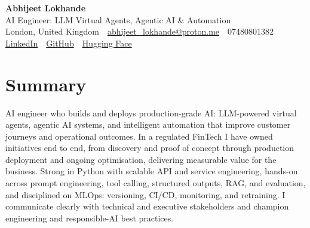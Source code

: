 \documentclass[10pt,a4paper]{article}
\newcommand{\sep}{\,\textcolor{accent!60}{\textbar}\,}
\begin{document}
\begin{center}
  {\fontsize{24}{26}\selectfont\bfseries Abhijeet Lokhande}\\[3pt]
  {\color{accent}\large AI Engineer: LLM Virtual Agents, Agentic AI \& Automation}\\[5pt]
  {\small
    London, United Kingdom \sep
    \href{mailto:abhijeet_lokhande@proton.me}{abhijeet\_lokhande@proton.me} \sep
    07480801382 \\[2pt]
    \href{https://www.linkedin.com/in/ablds/}{LinkedIn} \sep
    \href{https://github.com/abhijeetscode}{GitHub} \sep
    \href{https://huggingface.co/ab-ai}{Hugging Face}
  }
\end{center}
\vspace{2pt}

\section{Summary}
AI engineer who builds and deploys production-grade AI: LLM-powered virtual agents, agentic AI systems, and intelligent automation that improve customer journeys and operational outcomes. In a regulated FinTech I have owned initiatives end to end, from discovery and proof of concept through production deployment and ongoing optimisation, delivering measurable value for the business. Strong in Python with scalable API and service engineering, hands-on across prompt engineering, tool calling, structured outputs, RAG, and evaluation, and disciplined on MLOps: versioning, CI/CD, monitoring, and retraining. I communicate clearly with technical and executive stakeholders and champion engineering and responsible-AI best practices.

\end{document}
